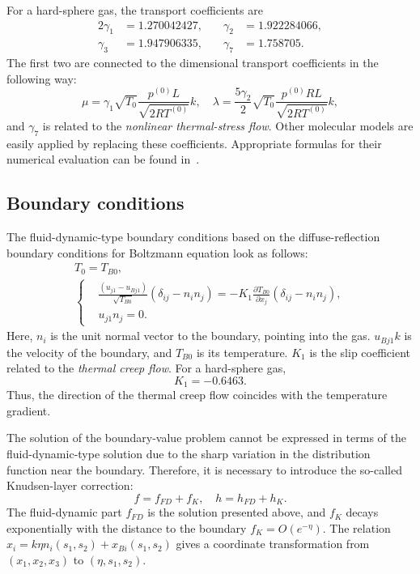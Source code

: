 \documentclass[smallextended, final]{svjour3} %
\newcommand{\pder}[2][]{\frac{\partial#1}{\partial#2}}
\begin{document}
For a hard-sphere gas, the transport coefficients are
\begin{alignat*}{2}
    \gamma_1 &= 1.270042427, &\quad \gamma_2 &= 1.922284066, \\
    \gamma_3 &= 1.947906335, &\quad \gamma_7 &= 1.758705.
\end{alignat*}
The first two are connected to the dimensional transport coefficients in the following way:
\begin{equation}
    \mu = \gamma_1\sqrt{T_0} \frac{p^{(0)}L}{\sqrt{2RT^{(0)}}} k, \quad
    \lambda = \frac{5\gamma_2}{2}\sqrt{T_0} \frac{p^{(0)}RL}{\sqrt{2RT^{(0)}}} k,
\end{equation}
and \(\gamma_7\) is related to the \emph{nonlinear thermal-stress flow}.
Other molecular models are easily applied by replacing these coefficients.
Appropriate formulas for their numerical evaluation can be found in~\cite{SoneBobylev96, Sone2002, Sone2007}.

\subsection{Boundary conditions}

The fluid-dynamic-type boundary conditions based on the diffuse-reflection boundary conditions
for Boltzmann equation look as follows:
\begin{gather}
    T_0 = T_{B0}, \label{eq:bound:T} \\
    \left\{
    \begin{aligned}
        & \frac{(u_{j1}-u_{Bj1})}{\sqrt{T_{B0}}}(\delta_{ij}-n_in_j) =
            -K_1\pder[T_{B0}]{x_j}(\delta_{ij}-n_in_j), \\
        & u_{j1}n_j = 0.
    \end{aligned}
    \right. \label{eq:bound:v}
\end{gather}
Here, \(n_i\) is the unit normal vector to the boundary, pointing into the gas.
\(u_{Bj1}k\) is the velocity of the boundary, and \(T_{B0}\) is its temperature.
\(K_1\) is the slip coefficient related to the \emph{thermal creep flow}.
For a hard-sphere gas, \[ K_1 = -0.6463. \]
Thus, the direction of the thermal creep flow coincides with the temperature gradient.

The solution of the boundary-value problem cannot be expressed in terms of the fluid-dynamic-type
solution due to the sharp variation in the distribution function near the boundary.
Therefore, it is necessary to introduce the so-called Knudsen-layer correction:
\begin{equation}
    f = f_{FD} + f_K, \quad h = h_{FD} + h_K.
\end{equation}
The fluid-dynamic part \(f_{FD}\) is the solution presented above,
and \(f_K\) decays exponentially with the distance to the boundary \(f_K = O\left(e^{-\eta}\right)\).
The relation \( x_i = k\eta n_i(s_1,s_2) + x_{Bi}(s_1, s_2) \) gives a coordinate transformation
from \((x_1,x_2,x_3)\) to \((\eta,s_1,s_2)\).
\end{document}
